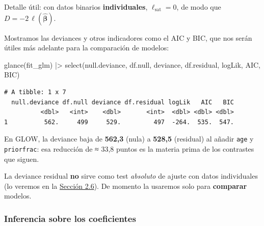 \documentclass[
  letterpaper,
  DIV=11,
  numbers=noendperiod]{scrartcl}
\newenvironment{Shaded}{\begin{snugshade}}{\end{snugshade}}
\newcommand{\FunctionTok}[1]{\textcolor[rgb]{0.28,0.35,0.67}{#1}}
\newcommand{\NormalTok}[1]{\textcolor[rgb]{0.00,0.23,0.31}{#1}}
\newcommand{\SpecialCharTok}[1]{\textcolor[rgb]{0.37,0.37,0.37}{#1}}
\begin{document}
\begin{tcolorbox}[enhanced jigsaw, coltitle=black, rightrule=.15mm, arc=.35mm, leftrule=.75mm, colback=white, colbacktitle=quarto-callout-tip-color!10!white, left=2mm, breakable, toptitle=1mm, toprule=.15mm, bottomtitle=1mm, titlerule=0mm, title=\textcolor{quarto-callout-tip-color}{\faLightbulb}\hspace{0.5em}{Tip}, bottomrule=.15mm, opacityback=0, opacitybacktitle=0.6, colframe=quarto-callout-tip-color-frame]

Detalle útil: con datos binarios \textbf{individuales},
\(\ell_{\text{sat}}=0\), de modo que
\(D=-2\,\ell(\hat{\boldsymbol\beta})\).

\end{tcolorbox}

Mostramos las deviances y otros indicadores como el AIC y BIC, que nos
serán útiles más adelante para la comparación de modelos:

\begin{Shaded}
\begin{Highlighting}[]
\FunctionTok{glance}\NormalTok{(fit\_glm) }\SpecialCharTok{|\textgreater{}}
  \FunctionTok{select}\NormalTok{(null.deviance, df.null, deviance, df.residual, logLik, AIC, BIC)}
\end{Highlighting}
\end{Shaded}

\begin{verbatim}
# A tibble: 1 x 7
  null.deviance df.null deviance df.residual logLik   AIC   BIC
          <dbl>   <int>    <dbl>       <int>  <dbl> <dbl> <dbl>
1          562.     499     529.         497  -264.  535.  547.
\end{verbatim}

En GLOW, la deviance baja de \textbf{562,3} (nula) a \textbf{528,5}
(residual) al añadir \texttt{age} y \texttt{priorfrac}: esa reducción de
≈ 33,8 puntos es la materia prima de los contrastes que siguen.

La deviance residual \textbf{no} sirve como test \emph{absoluto} de
ajuste con datos individuales (lo veremos en la
\protect\hyperlink{sec-u12-diagnostico}{Sección 2.6}). De momento la
usaremos solo para \textbf{comparar} modelos.

\hypertarget{inferencia-sobre-los-coeficientes}{%
\subsubsection{Inferencia sobre los
coeficientes}\label{inferencia-sobre-los-coeficientes}}
\end{document}
